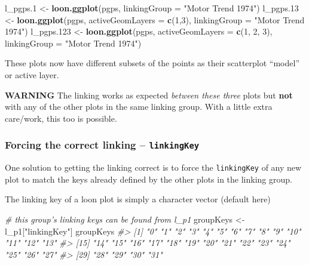 \documentclass[]{article}
\newenvironment{Shaded}{\begin{snugshade}}{\end{snugshade}}
\newcommand{\KeywordTok}[1]{\textcolor[rgb]{0.13,0.29,0.53}{\textbf{#1}}}
\newcommand{\DataTypeTok}[1]{\textcolor[rgb]{0.13,0.29,0.53}{#1}}
\newcommand{\DecValTok}[1]{\textcolor[rgb]{0.00,0.00,0.81}{#1}}
\newcommand{\StringTok}[1]{\textcolor[rgb]{0.31,0.60,0.02}{#1}}
\newcommand{\CommentTok}[1]{\textcolor[rgb]{0.56,0.35,0.01}{\textit{#1}}}
\newcommand{\NormalTok}[1]{#1}
\begin{document}
\begin{Shaded}
\begin{Highlighting}[]
\NormalTok{l_pgps.}\DecValTok{1}\NormalTok{ <-}\StringTok{ }\KeywordTok{loon.ggplot}\NormalTok{(pgps, }\DataTypeTok{linkingGroup =} \StringTok{"Motor Trend 1974"}\NormalTok{)}
\NormalTok{l_pgps.}\DecValTok{13}\NormalTok{ <-}\StringTok{ }\KeywordTok{loon.ggplot}\NormalTok{(pgps, }\DataTypeTok{activeGeomLayers =} \KeywordTok{c}\NormalTok{(}\DecValTok{1}\NormalTok{,}\DecValTok{3}\NormalTok{),}
                         \DataTypeTok{linkingGroup =} \StringTok{"Motor Trend 1974"}\NormalTok{)}
\NormalTok{l_pgps.}\DecValTok{123}\NormalTok{ <-}\StringTok{ }\KeywordTok{loon.ggplot}\NormalTok{(pgps, }\DataTypeTok{activeGeomLayers =} \KeywordTok{c}\NormalTok{(}\DecValTok{1}\NormalTok{, }\DecValTok{2}\NormalTok{, }\DecValTok{3}\NormalTok{),}
                         \DataTypeTok{linkingGroup =} \StringTok{"Motor Trend 1974"}\NormalTok{)}
\end{Highlighting}
\end{Shaded}

These plots now have different subsets of the points as their
scatterplot ``model'' or active layer.

\textbf{WARNING} The linking works as expected \emph{between these
three} plots but \textbf{not} with any of the other plots in the same
linking group. With a little extra care/work, this too is possible.

\subsubsection{\texorpdfstring{Forcing the correct linking --
\texttt{linkingKey}}{Forcing the correct linking -- linkingKey}}\label{forcing-the-correct-linking-linkingkey}

One solution to getting the linking correct is to force the
\texttt{linkingKey} of any new plot to match the keys already defined by
the other plots in the linking group.

The linking key of a loon plot is simply a character vector (default
here)

\begin{Shaded}
\begin{Highlighting}[]
\CommentTok{# this group's linking keys can be found from l_p1}
\NormalTok{groupKeys <-}\StringTok{ }\NormalTok{l_p1[}\StringTok{"linkingKey"}\NormalTok{]}
\NormalTok{groupKeys}
\CommentTok{#>  [1] "0"  "1"  "2"  "3"  "4"  "5"  "6"  "7"  "8"  "9"  "10" "11" "12" "13"}
\CommentTok{#> [15] "14" "15" "16" "17" "18" "19" "20" "21" "22" "23" "24" "25" "26" "27"}
\CommentTok{#> [29] "28" "29" "30" "31"}
\end{Highlighting}
\end{Shaded}
\end{document}
